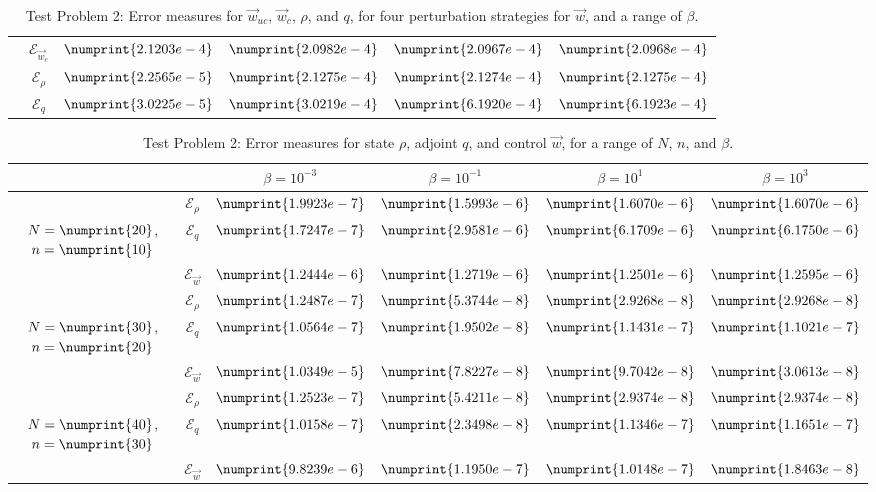\documentclass[11pt, a4paper]{article}
\theoremstyle{definition}
\newcommand{\adj}{q}
\begin{document}
\begin{table}
\begin{tabular}{ | c | c || c | c | c | c ||}
		& $\mathcal{E}_{\vec{w}_c}$ & $\numprint{2.1203e-4}$ & $\numprint{2.0982e-4}$ & $\numprint{2.0967e-4}$ & $\numprint{2.0968e-4}$ \\
		& $\mathcal{E}_{\rho}$ & $\numprint{2.2565e-5}$ & $\numprint{2.1275e-4}$ & $\numprint{2.1274e-4}$ & $\numprint{2.1275e-4}$ \\
		& $\mathcal{E}_{\adj}$ & $\numprint{3.0225e-5}$ & $\numprint{3.0219e-4}$ & $\numprint{6.1920e-4}$ & $\numprint{6.1923e-4}$ \\
		\hline
	\end{tabular}
	\caption{Test Problem 2: Error measures for $\vec{w}_{uc}$, $\vec{w}_{c}$, $\rho$, and $\adj$, for four perturbation strategies for $\vec{w}$, and a range of $\beta$.}
	\label{TabsA2:Prob1}
\end{table}
\begin{table}
	\centering
	\begin{tabular}{ | c | c || c | c | c | c ||}
		\hline
		\multicolumn{2}{|c||}{} & $\beta = 10^{-3}$ & $\beta = 10^{-1}$ & $\beta = 10^{1}$ & $\beta = 10^{3}$  \\
		\hline
		\hline
		& $\mathcal{E}_\rho$ & $\numprint{1.9923e-7}$ & $\numprint{1.5993e-6}$ & $\numprint{1.6070e-6}$ & $\numprint{1.6070e-6}$ \\
		$N = \numprint{20}$, $n = \numprint{10}$  & $\mathcal{E}_\adj$ & $\numprint{1.7247e-7}$ & $\numprint{2.9581e-6}$ & $\numprint{6.1709e-6}$ & $\numprint{6.1750e-6}$ \\
		& $\mathcal{E}_{\vec{w}}$ & $\numprint{1.2444e-6}$ & $\numprint{1.2719e-6}$ & $\numprint{1.2501e-6}$ & $\numprint{1.2595e-6}$ \\
		\hline
		& $\mathcal{E}_\rho$ & $\numprint{1.2487e-7}$ & $\numprint{5.3744e-8}$ & $\numprint{2.9268e-8}$ & $\numprint{2.9268e-8}$ \\
		$N = \numprint{30}$, $n = \numprint{20}$  & $\mathcal{E}_\adj$ & $\numprint{1.0564e-7}$ & $\numprint{1.9502e-8}$ & $\numprint{1.1431e-7}$ & $\numprint{1.1021e-7}$ \\
		& $\mathcal{E}_{\vec{w}}$ & $\numprint{1.0349e-5}$ & $\numprint{7.8227e-8}$ & $\numprint{9.7042e-8}$ & $\numprint{3.0613e-8}$ \\
		\hline
		& $\mathcal{E}_\rho$ & $\numprint{1.2523e-7}$ & $\numprint{5.4211e-8}$ & $\numprint{2.9374e-8}$ & $\numprint{2.9374e-8}$ \\
		$N = \numprint{40}$, $n = \numprint{30}$  & $\mathcal{E}_\adj$ & $\numprint{1.0158e-7}$ & $\numprint{2.3498e-8}$ & $\numprint{1.1346e-7}$ & $\numprint{1.1651e-7}$ \\
		& $\mathcal{E}_{\vec{w}}$ & $\numprint{9.8239e-6}$ & $\numprint{1.1950e-7}$ & $\numprint{1.0148e-7}$ & $\numprint{1.8463e-8}$ \\
		\hline
	\end{tabular}
	\caption{Test Problem 2: Error measures for state $\rho$, adjoint $\adj$, and control $\vec{w}$, for a range of $N$, $n$, and $\beta$.}
	\label{TabA1s:Prob2}
\end{table}
\end{document}
